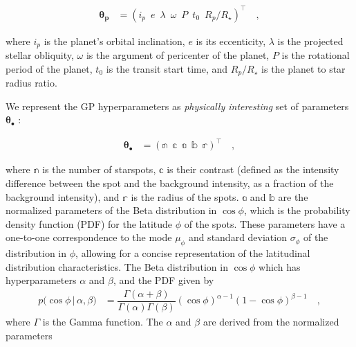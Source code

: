 \documentclass[twocolumn]{aastex631}
\begin{document}
\begin{linenomath}\begin{align}
    \label{eq:thetap}
    \pmb{\theta_p}
     & =
    \left(
    i_p
    \,\,\,
    e
    \,\,\,
    \lambda
    \,\,\,
    \omega
    \,\,\,
    P
    \,\,\,
    t_0
    \,\,\,
    R_p/R_\star
    \right)^\top
    \quad,
\end{align}\end{linenomath}
where $i_p$ is the planet's orbital inclination, $e$ is its eccenticity, $\lambda$ is the projected stellar obliquity, $\omega$ is the argument of pericenter of the planet,
$P$ is the rotational period of the planet, $t_0$ is the transit start time, and $R_p/R_\star$ is the planet to star radius ratio.

We represent the GP hyperparameters as \emph{physically interesting} set of parameters $\pmb{\theta}_\bullet$ \citep{Luger2021b}:
%
\begin{linenomath}\begin{align}
        \label{eq:thetaspot}
        \pmb{\theta}_\bullet
         & =
        \left(
        \mathbb{n}
        \,\,\,
        \mathbb{c}
        \,\,\,
        \mathbb{a}
        \,\,\,
        \mathbb{b}
        \,\,\,
        \mathbb{r}
        \right)^\top
        \quad,
    \end{align}\end{linenomath}
%
where $\mathbb{n}$ is the number of starspots, $\mathbb{c}$ is their contrast (defined as the intensity difference between the spot and the 
background intensity, as a fraction of the background intensity), and $\mathbb{r}$ is the radius
of the spots. $\mathbb{a}$ and $\mathbb{b}$ are the normalized parameters of the Beta distribution in $\cos\phi$, which is the probability density function (PDF) 
for the latitude $\phi$ of the spots. These parameters have a one-to-one correspondence to the mode $\mu_\phi$ and standard deviation $\sigma_\phi$ of the 
distribution in $\phi$, allowing for a concise representation of the latitudinal distribution characteristics.
The Beta distribution in $\cos\phi$ which has hyperparameters $\alpha$ and $\beta$, and the PDF given by
%
\begin{align}
    \label{eq:cosphi-pdf}
    p \big(\cos\phi \, \big| \, \alpha, \beta \big)
     & =
    \dfrac{\Gamma(\alpha + \beta)}{\Gamma(\alpha)\Gamma(\beta)}
    (\cos\phi)^{\alpha - 1}
    (1 - \cos\phi)^{\beta - 1}
    \quad,
\end{align}
%
where $\Gamma$ is the Gamma function. The $\alpha$ and $\beta$ are derived from the normalized parameters 
\end{document}
